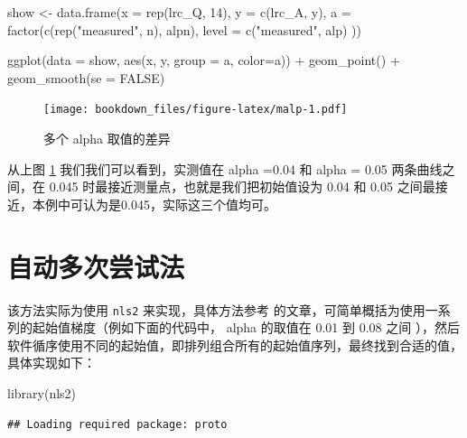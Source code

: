 \documentclass[
]{krantz}
\makeatletter
\newenvironment{Shaded}{\begin{snugshade}}{\end{snugshade}}
\newcommand{\AttributeTok}[1]{\textcolor[rgb]{0.77,0.63,0.00}{#1}}
\newcommand{\ConstantTok}[1]{\textcolor[rgb]{0.00,0.00,0.00}{#1}}
\newcommand{\DecValTok}[1]{\textcolor[rgb]{0.00,0.00,0.81}{#1}}
\newcommand{\FunctionTok}[1]{\textcolor[rgb]{0.00,0.00,0.00}{#1}}
\newcommand{\NormalTok}[1]{#1}
\newcommand{\OtherTok}[1]{\textcolor[rgb]{0.56,0.35,0.01}{#1}}
\newcommand{\SpecialCharTok}[1]{\textcolor[rgb]{0.00,0.00,0.00}{#1}}
\newcommand{\StringTok}[1]{\textcolor[rgb]{0.31,0.60,0.02}{#1}}
\newenvironment{kframe}{%
\medskip{}
\setlength{\fboxsep}{.8em}
 \def\at@end@of@kframe{}%
 \ifinner\ifhmode%
  \def\at@end@of@kframe{\end{minipage}}%
  \begin{minipage}{\columnwidth}%
 \fi\fi%
 \def\FrameCommand##1{\hskip\@totalleftmargin \hskip-\fboxsep
 \colorbox{shadecolor}{##1}\hskip-\fboxsep
     \hskip-\linewidth \hskip-\@totalleftmargin \hskip\columnwidth}%
 \MakeFramed {\advance\hsize-\width
   \@totalleftmargin\z@ \linewidth\hsize
   \@setminipage}}%
 {\par\unskip\endMakeFramed%
 \at@end@of@kframe}
\renewenvironment{Shaded}{\begin{kframe}}{\end{kframe}}
\makeatother
\begin{document}
\begin{Shaded}
\begin{Highlighting}[]
\NormalTok{show }\OtherTok{\textless{}{-}} \FunctionTok{data.frame}\NormalTok{(}\AttributeTok{x =} \FunctionTok{rep}\NormalTok{(lrc\_Q, }\DecValTok{14}\NormalTok{),}
           \AttributeTok{y =} \FunctionTok{c}\NormalTok{(lrc\_A, y), }
           \AttributeTok{a =} \FunctionTok{factor}\NormalTok{(}\FunctionTok{c}\NormalTok{(}\FunctionTok{rep}\NormalTok{(}\StringTok{"measured"}\NormalTok{, n), alpn),}
           \AttributeTok{level =} \FunctionTok{c}\NormalTok{(}\StringTok{"measured"}\NormalTok{, alp)}
\NormalTok{             ))}

\FunctionTok{ggplot}\NormalTok{(}\AttributeTok{data =}\NormalTok{ show, }\FunctionTok{aes}\NormalTok{(x, y, }\AttributeTok{group =}\NormalTok{ a, }\AttributeTok{color=}\NormalTok{a)) }\SpecialCharTok{+} 
  \FunctionTok{geom\_point}\NormalTok{() }\SpecialCharTok{+} 
  \FunctionTok{geom\_smooth}\NormalTok{(}\AttributeTok{se =} \ConstantTok{FALSE}\NormalTok{) }
\end{Highlighting}
\end{Shaded}

\begin{figure}
\centering
\texttt{[image: bookdown\_files/figure-latex/malp-1.pdf]}
\caption{\label{fig:malp}多个 alpha 取值的差异}
\end{figure}

从上图 \ref{fig:malp} 我们我们可以看到，实测值在 alpha =0.04 和 alpha = 0.05 两条曲线之间，在 0.045 时最接近测量点，也就是我们把初始值设为 0.04 和 0.05 之间最接近，本例中可认为是0.045，实际这三个值均可。

\hypertarget{mult_try}{%
\section{自动多次尝试法}\label{mult_try}}

该方法实际为使用 \texttt{nls2} 来实现，具体方法参考 \citet{nls2} 的文章，可简单概括为使用一系列的起始值梯度（例如下面的代码中， alpha 的取值在 0.01 到 0.08 之间 ），然后软件循序使用不同的起始值，即排列组合所有的起始值序列，最终找到合适的值，具体实现如下：

\begin{Shaded}
\begin{Highlighting}[]
\FunctionTok{library}\NormalTok{(nls2)}
\end{Highlighting}
\end{Shaded}

\begin{verbatim}
## Loading required package: proto
\end{verbatim}
\end{document}
